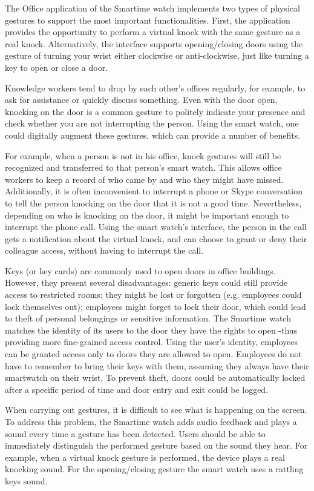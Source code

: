 \documentclass{article}
\begin{document}
The Office application of the Smartime watch implements two types of physical gestures to support the most important functionalities. First, the application provides the opportunity to perform a virtual knock with the same gesture as a real knock.  Alternatively, the interface supports opening/closing doors using the gesture of turning your wrist either clockwise or anti-clockwise, just like turning a key to open or close a door. 

Knowledge workers tend to drop by each other's offices regularly, for example, to ask for assistance or quickly discuss something. Even with the door open, knocking on the door is a common gesture to politely indicate your presence and check whether you are not interrupting the person. Using the smart watch, one could digitally augment these gestures, which can provide a number of benefits. 

For example, when a person is not in his office, knock gestures will still be recognized and transferred to that person's smart watch. This allows office workers to keep a record of who came by and who they might have missed. Additionally, it is often inconvenient to interrupt a phone or Skype conversation to tell the person knocking on the door that it is not a good time. Nevertheless, depending on who is knocking on the door, it might be important enough to interrupt the phone call. Using the smart watch's interface, the person in the call gets a notification about the virtual knock, and can choose to grant or deny their colleague access, without having to interrupt the call. 

Keys (or key cards) are commonly used to open doors in office buildings. However, they present several disadvantages: generic keys could still provide access to restricted rooms; they might be lost or forgotten (e.g. employees could lock themselves out); employees might forget to lock their door, which could lead to theft of personal belongings or sensitive information. The Smartime watch matches the identity of its users to the door they have the rights to open -thus providing more fine-grained access control. Using the user's identity, employees can be granted access only to doors they are allowed to open. Employees do not have to remember to bring their keys with them, assuming they always have their smartwatch on their wrist. To prevent theft, doors could be automatically locked after a specific period of time and door entry and exit could be logged. 

When carrying out gestures, it is difficult to see what is happening on the screen. To address this problem, the Smartime watch adds audio feedback and plays a sound every time a gesture has been detected. Users should be able to immediately distinguish the performed gesture based on the sound they hear. For example, when a virtual knock gesture is performed, the device plays a real knocking sound. For the opening/closing gesture the smart watch uses a rattling keys sound.
\end{document}
